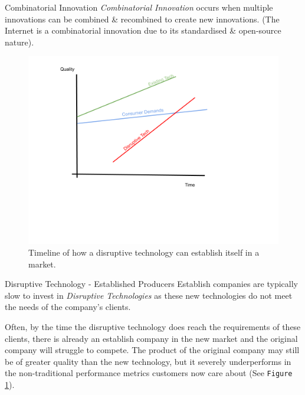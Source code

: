 \documentclass[11pt,a4paper]{article}
\begin{document}
  \begin{definition}{Combinatorial Innovation}
    \textit{Combinatorial Innovation} occurs when multiple innovations can be combined \& recombined to create new innovations. (The Internet is a combinatorial innovation due to its standardised \& open-source nature).
  \end{definition}

  \begin{figure}[ht!]
    \centering
    \includegraphics[width=.5\textwidth]{disruptiveTechnology.png}
    \caption{Timeline of how a disruptive technology can establish itself in a market.}
    \label{fig_DisruptiveTechnology}
  \end{figure}

  \begin{remark}{Disruptive Technology - Established Producers}
    Establish companies are typically slow to invest in \textit{Disruptive Technologies} as these new technologies do not meet the needs of the company's clients.
    \par Often, by the time the disruptive technology does reach the requirements of these clients, there is already an establish company in the new market and the original company will struggle to compete. The product of the original company may still be of greater quality than the new technology, but it severely underperforms in the non-traditional performance metrics customers now care about (See \texttt{Figure \ref{fig_DisruptiveTechnology}}).
  \end{remark}
\end{document}
